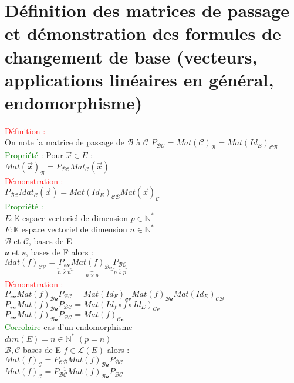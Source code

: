\documentclass{article}
\begin{document}
        \section{Définition des matrices de passage et démonstration des formules de changement de base (vecteurs, applications linéaires en général, endomorphisme)}
				\textcolor{red}{Définition :} \\
				On  note la matrice de passage de $\mathcal B$ à $\mathcal C$ $P_{\mathcal{BC}}= Mat(\mathcal C)_{\mathcal B}= Mat(Id_E)_{\mathcal{CB}}$ \\
				\textcolor{green}{Propriété :} Pour $\vec x \in E$ : \\
				$Mat(\vec x)_{\mathcal B}=P_{\mathcal{BC}} Mat_{\mathcal C}(\vec x)$ \\
				\textcolor{red}{Démonstration :}  \\
				$P_{\mathcal{BC}}Mat_{\mathcal C}(\vec x)= Mat(Id_E)_{\mathcal{CB}} Mat(\vec x)_{\mathcal C}$ \\
				\textcolor{green}{Propriété :} \\
				$E: \mathbb K$ espace vectoriel de dimension $p \in \mathbb N^*$ \\
				$F: \mathbb K$ espace vectoriel de dimension $n \in \mathbb N^*$ \\
				$\mathcal B$ et $\mathcal C$, bases de  E \\
				$\mathcal u$ et $\mathcal v$, bases de F alors : \\
				$Mat(f)_{\mathcal{CV}}= \underbrace{P_{\mathcal{vu}}}_{n \times n} \underbrace{Mat(f)_{\mathcal{Bu}}}_{n \times p}  \underbrace{P_{\mathcal{BC}}}_{p \times p}$ \\
				\textcolor{red}{Démonstration :} \\
				$P_{\mathcal{vu}} Mat(f)_{\mathcal{Bu}} P_{\mathcal{BC}}=Mat(Id_F)_{\mathcal{uv}} Mat(f)_{\mathcal{Bu}} Mat(Id_E)_{\mathcal{CB}}$ \\
				$P_{\mathcal{vu}} Mat(f)_{\mathcal{Bu}} P_{\mathcal{BC}} = Mat(Id_f \circ f \circ Id_E)_{\mathcal{Cv}}$ \\
				$P_{\mathcal{vu}} Mat(f)_{\mathcal{Bu}}  P_{\mathcal{BC}} = Mat(f)_{\mathcal{Cv}}$ \\
				\textcolor{green}{Corrolaire} cas d'un endomorphisme \\
				$dim(E)=n \in \mathbb N^*$ $(p=n)$ \\
				$\mathcal {B,C}$ bases de E $f \in \mathcal L (E)$  alors : \\
				$Mat(f)_{\mathcal C}=P_{\mathcal{CB}} Mat(f)_{\mathcal{Bu}} P_{\mathcal{BC}}$ \\
				$Mat(f)_{\mathcal C}=P^{-1}_{\mathcal{BC}} Mat(f)_{\mathcal{Bu}} P_{\mathcal{BC}}$
\end{document}

